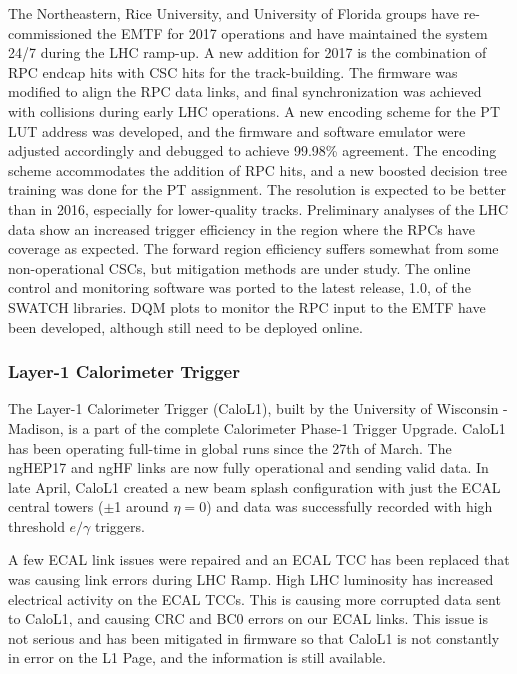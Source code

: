 The Northeastern, Rice University, and University of Florida groups have re-commissioned the EMTF for 2017 operations and have maintained the system 24/7 during the LHC ramp-up. A new addition for 2017 is the combination of RPC endcap hits with CSC hits for the track-building. The firmware was modified to align the RPC data links, and final synchronization was achieved with collisions during early LHC operations. A new encoding scheme for the PT LUT address was developed, and the firmware and software emulator were adjusted accordingly and debugged to achieve 99.98\% agreement. The encoding scheme accommodates the addition of RPC hits, and a new boosted decision tree training was done for the PT assignment. The resolution is expected to be better than in 2016, especially for lower-quality tracks. Preliminary analyses of the LHC data show an increased trigger efficiency in the region where the RPCs have coverage as expected. The forward region efficiency suffers somewhat from some non-operational CSCs, but mitigation methods are under study. The online control and monitoring software was ported to the latest release, 1.0, of the SWATCH libraries. DQM plots to monitor the RPC input to the EMTF have been developed, although still need to be deployed online.

\subsubsection{Layer-1 Calorimeter Trigger}

The Layer-1 Calorimeter Trigger (CaloL1), built by the University of Wisconsin - Madison, is a part of the complete Calorimeter Phase-1 Trigger Upgrade.  CaloL1 has
been operating full-time in global runs since the 27th of March.  The ngHEP17 and ngHF links are now fully operational and sending valid data.  In late April, CaloL1 created a new beam splash configuration with just the ECAL central towers ($\pm$1 around $\eta=0$) and data was successfully recorded with high threshold $e/\gamma$ triggers. 

A few ECAL link issues were repaired and an ECAL TCC has been replaced that was causing link errors during LHC Ramp.  High LHC luminosity has increased electrical activity  on the ECAL TCCs. This is causing more corrupted data sent to CaloL1, and causing CRC and BC0 errors on our ECAL links.  This issue is not serious and has been mitigated in firmware so that CaloL1 is not constantly in error on the L1 Page, and the information is still available.

